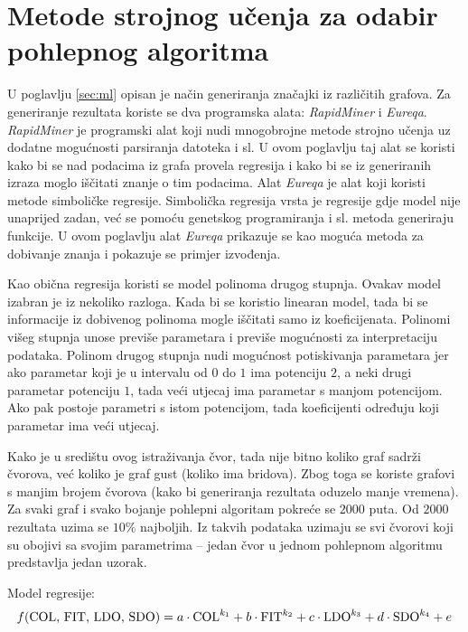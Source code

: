 \documentclass[times, utf8, diplomski, numeric]{fer}
\begin{document}
\section{Metode strojnog učenja za odabir pohlepnog algoritma}

U poglavlju \ref{sec:ml} opisan je način generiranja značajki iz različitih grafova. Za generiranje rezultata koriste se dva programska alata: \emph{RapidMiner} i \emph{Eureqa}. \emph{RapidMiner} je programski alat koji nudi mnogobrojne metode strojno učenja uz dodatne mogućnosti parsiranja datoteka i sl. U ovom poglavlju taj alat se koristi kako bi se nad podacima iz grafa provela regresija i kako bi se iz generiranih izraza moglo iščitati znanje o tim podacima. Alat \emph{Eureqa} je alat koji koristi metode simboličke regresije. Simbolička regresija vrsta je regresije gdje model nije unaprijed zadan, već se pomoću genetskog programiranja i sl. metoda generiraju funkcije. U ovom poglavlju alat \emph{Eureqa} prikazuje se kao moguća metoda za dobivanje znanja i pokazuje se primjer izvođenja.

Kao obična regresija koristi se model polinoma drugog stupnja. Ovakav model izabran je iz nekoliko razloga. Kada bi se koristio linearan model, tada bi se informacije iz dobivenog polinoma mogle iščitati samo iz koeficijenata. Polinomi višeg stupnja unose previše parametara i previše mogućnosti za interpretaciju podataka. Polinom drugog stupnja nudi mogućnost potiskivanja parametara jer ako parametar koji je u intervalu od $0$ do $1$ ima potenciju $2$, a neki drugi parametar potenciju $1$, tada veći utjecaj ima parametar s manjom potencijom. Ako pak postoje parametri s istom potencijom, tada koeficijenti određuju koji parametar ima veći utjecaj.

Kako je u središtu ovog istraživanja čvor, tada nije bitno koliko graf sadrži čvorova, već koliko je graf gust (koliko ima bridova). Zbog toga se koriste grafovi s manjim brojem čvorova (kako bi generiranja rezultata oduzelo manje vremena). Za svaki graf i svako bojanje pohlepni algoritam pokreće se $2000$ puta. Od $2000$ rezultata uzima se $10\%$ najboljih. Iz takvih podataka uzimaju se svi čvorovi koji su obojivi sa svojim parametrima -- jedan čvor u jednom pohlepnom algoritmu predstavlja jedan uzorak.

Model regresije:
\begin{equation}
	f(\textup{COL, FIT, LDO, SDO}) = a\cdot \textup{COL}^{k_1} + b\cdot \textup{FIT}^{k_2} + c\cdot \textup{LDO}^{k_3} + d\cdot \textup{SDO}^{k_4} + e
\end{equation}
\end{document}
